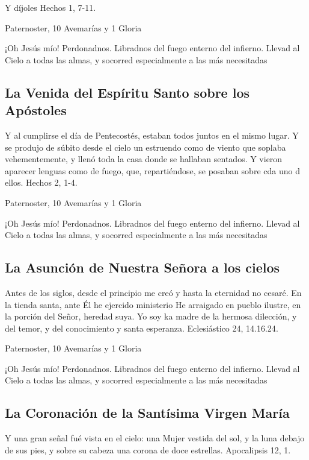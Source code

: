 \documentclass[a4paper,11pt, oneside]{report}
\begin{document}
        Y díjoles Hechos 1, 7-11\cite{bover-cantera}.

        \smallskip
         Paternoster, 10 Avemarías y 1 Gloria
        
        \smallskip
        ¡Oh Jesús mío! Perdonadnos. Libradnos del fuego enterno del infierno. Llevad al Cielo a todas las almas, y socorred especialmente a las más 
        necesitadas
        
      \subsection{La Venida del Espíritu Santo sobre los Apóstoles}
        Y al cumplirse el día de Pentecostés, estaban todos juntos en el mismo lugar. Y se produjo de súbito desde el cielo un estruendo como de viento
        que soplaba vehementemente, y llenó toda la casa donde se hallaban sentados. Y vieron aparecer lenguas como de fuego, que, repartiéndose, se 
        posaban sobre cda uno d ellos. Hechos 2, 1-4\cite{bover-cantera}.

        \smallskip
         Paternoster, 10 Avemarías y 1 Gloria
        
        \smallskip
        ¡Oh Jesús mío! Perdonadnos. Libradnos del fuego enterno del infierno. Llevad al Cielo a todas las almas, y socorred especialmente a las más 
        necesitadas

      \subsection{La Asunción de Nuestra Señora a los cielos}
        Antes de los siglos, desde el principio me creó y hasta la eternidad no cesaré. En la tienda santa, ante Él he ejercido ministerio
        He arraigado en pueblo ilustre, en la porción del Señor, heredad suya. Yo soy ka madre de la hermosa dilección, y del temor, y del
        conocimiento y santa esperanza. Eclesiástico 24, 14.16.24\cite{bover-cantera}.

        \smallskip
         Paternoster, 10 Avemarías y 1 Gloria
        
        \smallskip
        ¡Oh Jesús mío! Perdonadnos. Libradnos del fuego enterno del infierno. Llevad al Cielo a todas las almas, y socorred especialmente a las más 
        necesitadas

      \subsection{La Coronación de la Santísima Virgen María}
        Y una gran señal fué vista en el cielo: una Mujer vestida del sol, y la luna debajo de sus pies, y sobre su cabeza una corona de doce estrellas.
        Apocalipsis 12, 1\cite{bover-cantera}.
\end{document}
